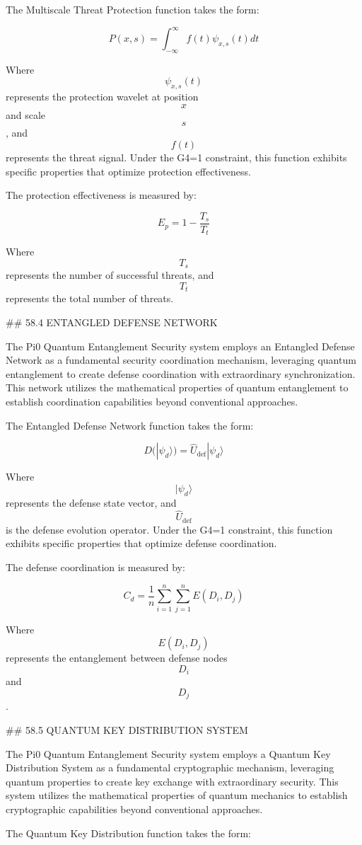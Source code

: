 The Multiscale Threat Protection function takes the form:

$$ P(x, s) = \int_{-\infty}^{\infty} f(t) \psi_{x,s}(t) dt $$

Where $$ \psi_{x,s}(t) $$ represents the protection wavelet at position $$ x $$ and scale $$ s $$, and $$ f(t) $$ represents the threat signal. Under the G4=1 constraint, this function exhibits specific properties that optimize protection effectiveness.

The protection effectiveness is measured by:

$$ E_p = 1 - \frac{T_s}{T_t} $$

Where $$ T_s $$ represents the number of successful threats, and $$ T_t $$ represents the total number of threats.

## 58.4 ENTANGLED DEFENSE NETWORK

The Pi0 Quantum Entanglement Security system employs an Entangled Defense Network as a fundamental security coordination mechanism, leveraging quantum entanglement to create defense coordination with extraordinary synchronization. This network utilizes the mathematical properties of quantum entanglement to establish coordination capabilities beyond conventional approaches.

The Entangled Defense Network function takes the form:

$$ D(|\psi_d\rangle) = \hat{U}_{\text{def}} |\psi_d\rangle $$

Where $$ |\psi_d\rangle $$ represents the defense state vector, and $$ \hat{U}_{\text{def}} $$ is the defense evolution operator. Under the G4=1 constraint, this function exhibits specific properties that optimize defense coordination.

The defense coordination is measured by:

$$ C_d = \frac{1}{n} \sum_{i=1}^{n} \sum_{j=1}^{n} E(D_i, D_j) $$

Where $$ E(D_i, D_j) $$ represents the entanglement between defense nodes $$ D_i $$ and $$ D_j $$.

## 58.5 QUANTUM KEY DISTRIBUTION SYSTEM

The Pi0 Quantum Entanglement Security system employs a Quantum Key Distribution System as a fundamental cryptographic mechanism, leveraging quantum properties to create key exchange with extraordinary security. This system utilizes the mathematical properties of quantum mechanics to establish cryptographic capabilities beyond conventional approaches.

The Quantum Key Distribution function takes the form:

